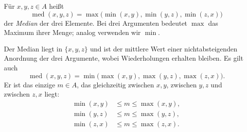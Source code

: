 \begin{definition}[Median]
\label{b15guide:def:median}
Für $x,y,z\in A$ heißt
\[
 \operatorname{med}(x,y,z)=
 \max\bigl(\min(x,y),\min(y,z),\min(z,x)\bigr)
\]
der \emph{Median} der drei Elemente. Bei drei Argumenten
bedeutet $\max$ das Maximum ihrer Menge; analog verwenden wir $\min$.
\end{definition}

\begin{theorem}
\label{b15guide:thm:median}
Der Median liegt in $\{x,y,z\}$ und ist der mittlere Wert
einer nichtabsteigenden Anordnung der drei Argumente,
wobei Wiederholungen erhalten bleiben. Es gilt auch
\[
 \operatorname{med}(x,y,z)=
 \min\bigl(\max(x,y),\max(y,z),\max(z,x)\bigr).
\]
Er ist das einzige $m\in A$, das gleichzeitig zwischen
$x,y$, zwischen $y,z$ und zwischen $z,x$ liegt:
\[
\begin{aligned}
 \min(x,y)&\leq m\leq\max(x,y),\\
 \min(y,z)&\leq m\leq\max(y,z),\\
 \min(z,x)&\leq m\leq\max(z,x).
\end{aligned}
\]
\end{theorem}
